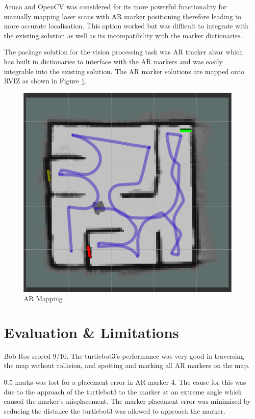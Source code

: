 \documentclass[11pt, a4, nocenter, margin=150mm]{article}
\begin{document}
	Aruco and OpenCV was considered for its more powerful functionality for manually mapping laser scans with AR marker positioning therefore leading to more accurate localisation. This option worked but was difficult to integrate with the existing solution as well as its incompatibility with the marker dictionaries.

	The package solution for the vision processing task was AR tracker alvar which has built in dictionaries to interface with the AR markers and was easily integrable into the existing solution. The AR marker solutions are mapped onto RVIZ as shown in Figure \ref{fig:ar_markers}.

	\begin{figure}[h!]
		\centering
		\includegraphics[width=120mm]{ar-markers.png}
		\caption{AR Mapping}
		\label{fig:ar_markers}
	\end{figure}

\section{Evaluation \& Limitations}
\label{sec:evaluate}

	Bob Ros scored 9/10. The turtlebot3's performance was very good in traversing the map without collision, and spotting and marking all AR markers on the map.

	0.5 marks was lost for a placement error in AR marker 4. The cause for this was due to the approach of the turtlebot3 to the marker at an extreme angle which caused the marker's misplacement. The marker placement error was minimised by reducing the distance the turtlebot3 was allowed to approach the marker.
\end{document}
